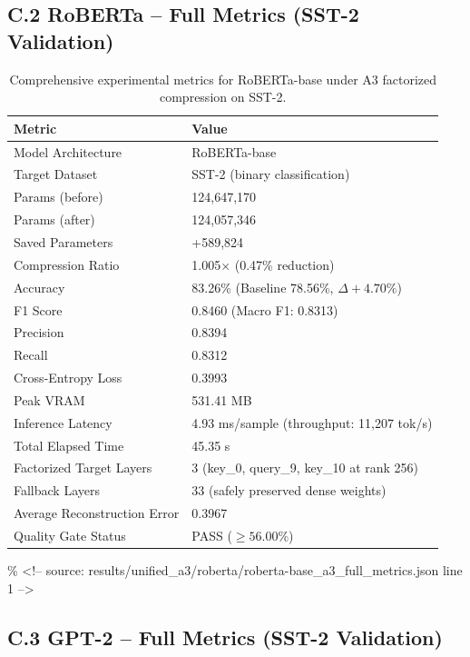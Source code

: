 \subsection{C.2 RoBERTa -- Full Metrics (SST-2 Validation)}

\begin{table}[H]
\centering
\small
\begin{tabular}{ll}
\toprule
\textbf{Metric} & \textbf{Value} \\
\midrule
Model Architecture & RoBERTa-base \\
Target Dataset & SST-2 (binary classification) \\
Params (before) & 124,647,170 \\
Params (after) & 124,057,346 \\
Saved Parameters & +589,824 \\
Compression Ratio & 1.005$\times$ (0.47\% reduction) \\
Accuracy & 83.26\% (Baseline 78.56\%, $\Delta +4.70\%$) \\
F1 Score & 0.8460 (Macro F1: 0.8313) \\
Precision & 0.8394 \\
Recall & 0.8312 \\
Cross-Entropy Loss & 0.3993 \\
Peak VRAM & 531.41 MB \\
Inference Latency & 4.93 ms/sample (throughput: 11,207 tok/s) \\
Total Elapsed Time & 45.35 s \\
Factorized Target Layers & 3 (key\_0, query\_9, key\_10 at rank 256) \\
Fallback Layers & 33 (safely preserved dense weights) \\
Average Reconstruction Error & 0.3967 \\
Quality Gate Status & PASS ($\ge 56.00\%$) \\
\bottomrule
\end{tabular}
\caption{Comprehensive experimental metrics for RoBERTa-base under A3 factorized compression on SST-2.}
\label{tab:roberta_full_metrics}
\end{table}
\% \textless{}!-- source: results/unified\_a3/roberta/roberta-base\_a3\_full\_metrics.json line 1 --\textgreater{}

\subsection{C.3 GPT-2 -- Full Metrics (SST-2 Validation)}

